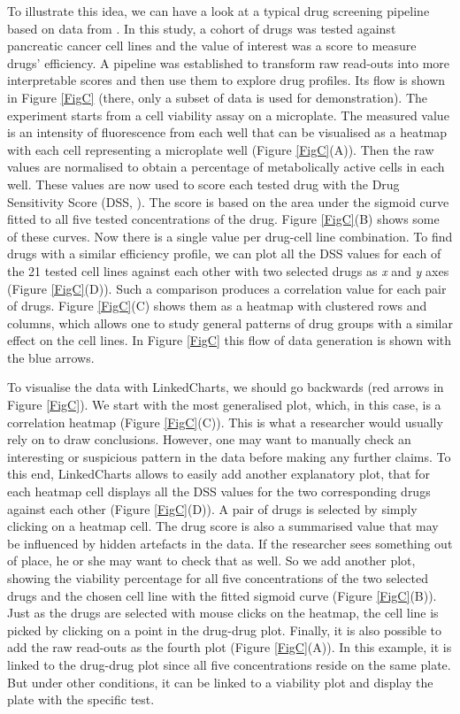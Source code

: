 \documentclass[twocolumn,10pt]{article}
\begin{document}
To illustrate this idea, we can have a look at a typical drug screening pipeline based on data from \citet{he_2018}. In this study, a cohort of drugs was tested against pancreatic cancer cell lines and the value of interest was a score to measure drugs' efficiency. A pipeline was established to transform raw read-outs into more interpretable scores and then use them to explore drug profiles. Its flow is shown in Figure \ref{FigC} (there, only a subset of data is used for demonstration). The experiment starts from a cell viability assay on a microplate. The measured value is an intensity of fluorescence from each well that can be visualised as a heatmap with each cell representing a microplate well (Figure \ref{FigC}(A)). Then the raw values are normalised to obtain a percentage of metabolically active cells in each well. These values are now used to score each tested drug with the Drug Sensitivity Score (DSS, \citep{yadav_2014}). The score is based on the area under the sigmoid curve fitted to all five tested concentrations of the drug. Figure \ref{FigC}(B) shows some of these curves. Now there is a single value per drug-cell line combination. To find drugs with a similar efficiency profile, we can plot all the DSS values for each of the 21 tested cell lines against each other with two selected drugs as \emph{x} and \emph{y} axes (Figure \ref{FigC}(D)). Such a comparison produces a correlation value for each pair of drugs. Figure \ref{FigC}(C) shows them as a heatmap with clustered rows and columns, which allows one to study general patterns of drug groups with a similar effect on the cell lines. In Figure \ref{FigC} this flow of data generation is shown with the blue arrows.

To visualise the data with LinkedCharts, we should go backwards (red arrows in Figure \ref{FigC}). We start with the most generalised plot, which, in this case, is a correlation heatmap (Figure \ref{FigC}(C)). This is what a researcher would usually rely on to draw conclusions. However, one may want to manually check an interesting or suspicious pattern in the data before making any further claims. To this end, LinkedCharts allows to easily add another explanatory plot, that for each heatmap cell displays all the DSS values for the two corresponding drugs against each other (Figure \ref{FigC}(D)). A pair of drugs is selected by simply clicking on a heatmap cell. The drug score is also a summarised value that may be influenced by hidden artefacts in the data. If the researcher sees something out of place, he or she may want to check that as well. So we add another plot, showing the viability percentage for all five concentrations of the two selected drugs and the chosen cell line with the fitted sigmoid curve (Figure \ref{FigC}(B)). Just as the drugs are selected with mouse clicks on the heatmap, the cell line is picked by clicking on a point in the drug-drug plot. Finally, it is also possible to add the raw read-outs as the fourth plot (Figure \ref{FigC}(A)). In this example, it is linked to the drug-drug plot since all five concentrations reside on the same plate. But under other conditions, it can be linked to a viability plot and display the plate with the specific test.
\end{document}
